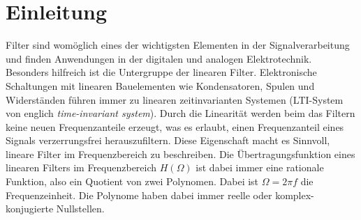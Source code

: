 \section{Einleitung}

Filter sind womöglich eines der wichtigsten Elementen in der Signalverarbeitung und finden Anwendungen in der digitalen und analogen Elektrotechnik.
Besonders hilfreich ist die Untergruppe der linearen Filter.
Elektronische Schaltungen mit linearen Bauelementen wie Kondensatoren, Spulen und Widerständen führen immer zu linearen zeitinvarianten Systemen (LTI-System von englich \textit{time-invariant system}).
Durch die Linearität werden beim das Filtern keine neuen Frequenzanteile erzeugt, was es erlaubt, einen Frequenzanteil eines Signals verzerrungsfrei herauszufiltern. %
Diese Eigenschaft macht es Sinnvoll, lineare Filter im Frequenzbereich zu beschreiben.
Die Übertragungsfunktion eines linearen Filters im Frequenzbereich $H(\Omega)$ ist dabei immer eine rationale Funktion, also ein Quotient von zwei Polynomen.
Dabei ist $\Omega = 2 \pi f$ die Frequenzeinheit.
Die Polynome haben dabei immer reelle oder komplex-konjugierte Nullstellen.

